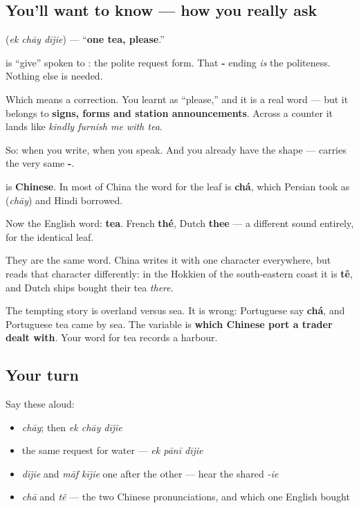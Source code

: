 \subsection*{You'll want to know — how you really ask}
\textbf{  } (\emph{ek chāy dījie}) — \textquotedblleft{}\textbf{one tea, please}.\textquotedblright{}

\textbf{} is \textquotedblleft{}give\textquotedblright{} spoken to \textbf{}: the polite request form. That \textbf{-} ending \emph{is} the politeness. Nothing else is needed.

Which means a correction. You learnt \textbf{} as \textquotedblleft{}please,\textquotedblright{} and it is a real word — but it belongs to \textbf{signs, forms and station announcements}. Across a counter it lands like \emph{kindly furnish me with tea}.

So: \textbf{} when you write, \textbf{} when you speak. And you already have the shape — \textbf{ } carries the very same \textbf{-}.

\begin{cousinweb}
\textbf{} is \textbf{Chinese}. In most of China the word for the leaf is \textbf{chá}, which Persian took as \textbf{} (\emph{chāy}) and Hindi borrowed.

Now the English word: \textbf{tea}. French \textbf{thé}, Dutch \textbf{thee} — a different sound entirely, for the identical leaf.

They are the same word. China writes it with one character everywhere, but reads that character differently: in the Hokkien of the south-eastern coast it is \textbf{tê}, and Dutch ships bought their tea \emph{there}.

The tempting story is overland versus sea. It is wrong: Portuguese say \textbf{chá}, and Portuguese tea came by sea. The variable is \textbf{which Chinese port a trader dealt with}. Your word for tea records a harbour.
\end{cousinweb}

\subsection*{Your turn}
Say these aloud:

\begin{itemize}
\raggedright
  \item \emph{chāy}; then \emph{ek chāy dījie}
  \item the same request for water — \emph{ek pānī dījie}
  \item \emph{dījie} and \emph{māf kījie} one after the other — hear the shared \emph{-ie}
  \item \emph{chā} and \emph{tê} — the two Chinese pronunciations, and which one English bought
\end{itemize}


